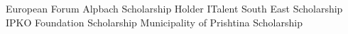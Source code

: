 %
%
%


\begin{scholarship}
					{European Forum Alpbach Scholarship Holder}
					{ITalent South East Scholarship }
					{IPKO Foundation Scholarship }
					{Municipality of Prishtina Scholarship }
\end{scholarship}